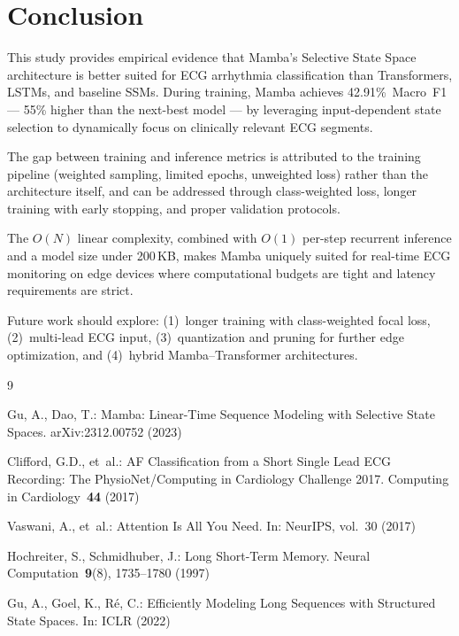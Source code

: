 \documentclass[runningheads]{llncs}
\begin{document}
\section{Conclusion}
\label{sec:conclusion}

This study provides empirical evidence that Mamba's Selective State Space
architecture is better suited for ECG arrhythmia classification than
Transformers, LSTMs, and baseline SSMs. During training, Mamba achieves
42.91\%~Macro~F1 --- 55\% higher than the next-best model --- by leveraging
input-dependent state selection to dynamically focus on clinically relevant
ECG segments.

The gap between training and inference metrics is attributed to the training
pipeline (weighted sampling, limited epochs, unweighted loss) rather than the
architecture itself, and can be addressed through class-weighted loss, longer
training with early stopping, and proper validation protocols.

The $O(N)$ linear complexity, combined with $O(1)$ per-step recurrent
inference and a model size under 200\,KB, makes Mamba uniquely suited for
real-time ECG monitoring on edge devices where computational budgets are tight
and latency requirements are strict.

Future work should explore: (1)~longer training with class-weighted focal
loss, (2)~multi-lead ECG input, (3)~quantization and pruning for further edge
optimization, and (4)~hybrid Mamba--Transformer architectures.


\begin{thebibliography}{9}

Gu, A., Dao, T.:
Mamba: Linear-Time Sequence Modeling with Selective State Spaces.
arXiv:2312.00752 (2023)

Clifford, G.D., et~al.:
AF Classification from a Short Single Lead ECG Recording: The
PhysioNet/Computing in Cardiology Challenge 2017.
Computing in Cardiology~\textbf{44} (2017)

Vaswani, A., et~al.:
Attention Is All You Need.
In: NeurIPS, vol.~30 (2017)

Hochreiter, S., Schmidhuber, J.:
Long Short-Term Memory.
Neural Computation~\textbf{9}(8), 1735--1780 (1997)

Gu, A., Goel, K., R{\'e}, C.:
Efficiently Modeling Long Sequences with Structured State Spaces.
In: ICLR (2022)

\end{thebibliography}
\end{document}
